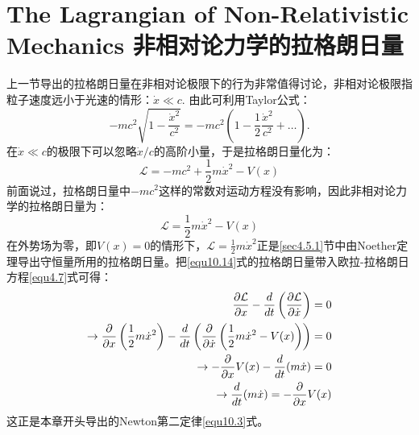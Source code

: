 \section[非相对论力学的拉格朗日量]{The Lagrangian of Non-Relativistic Mechanics \quad 非相对论力学的拉格朗日量}
\label{sec10.2}
上一节导出的拉格朗日量在非相对论极限下的行为非常值得讨论，非相对论极限指粒子速度远小于光速的情形：$\dot{x} \ll c$. 由此可利用Taylor公式：
\begin{equation}
\label{equ10.12}
    -mc^2 \sqrt{1 - \frac{\dot{x}^2}{c^2}} = -mc^2 \left( 1 - \frac{1}{2} \frac{\dot{x}^2}{c^2} + \dots \right).
\end{equation}
在$\dot{x} \ll c$的极限下可以忽略$\dot{x}/c$的高阶小量，于是拉格朗日量化为：
\begin{equation}
\label{equ10.13}
    \mathcal{L} = -mc^2 + \frac{1}{2} m \dot{x}^2 - V(x)
\end{equation}
前面说过，拉格朗日量中$-mc^2$这样的常数对运动方程没有影响，因此{非相对论力学的拉格朗日量}为：
\begin{equation}
\label{equ10.14}
    \mathcal{L} = \frac{1}{2} m \dot{x}^2 - V(x)
\end{equation}
在外势场为零，即$V(x) = 0$的情形下，$\mathcal{L} = \frac{1}{2} m \dot{x}^2$正是\ref{sec4.5.1}节中由Noether定理导出守恒量所用的拉格朗日量。把\eqref{equ10.14}式的拉格朗日量带入欧拉-拉格朗日方程\eqref{equ4.7}式可得：
\begin{align}
    \frac{\partial \mathcal{L}}{\partial x} - \frac{d}{dt} \left( \frac{\partial \mathcal{L}}{\partial \dot{x}} \right) = 0 \notag \\
    \to \frac{\partial}{\partial x} \left( \frac{1}{2} m \dot{x}^2 \right) - \frac{d}{dt} \left( \frac{\partial}{\partial \dot{x}} \left( \frac{1}{2} m \dot{x}^2 - V(x) \right) \right) = 0 \notag \\
    \to -\frac{\partial}{\partial x} V(x) - \frac{d}{dt} (m \dot{x}) = 0 \notag \\
\label{equ10.15}
    \to \frac{d}{dt} (m \dot{x}) = - \frac{\partial}{\partial x} V(x)
\end{align}
这正是本章开头导出的Newton第二定律\eqref{equ10.3}式。
